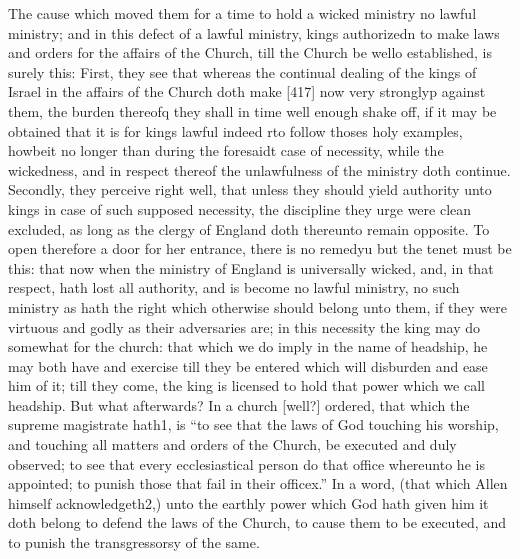 The cause which moved them for a time to hold a wicked ministry no lawful ministry; and in this defect of a lawful ministry, kings authorizedn to make laws and orders for the affairs of the Church, till the Church be wello established, is surely this: First, they see that whereas the continual dealing of the kings of Israel in the affairs of the Church doth make [417] now very stronglyp against them, the burden thereofq they shall in time well enough shake off, if it may be obtained that it is for kings lawful indeed rto follow thoses holy examples, howbeit no longer than during the foresaidt case of necessity, while the wickedness, and in respect thereof the unlawfulness of the ministry doth continue. Secondly, they perceive right well, that unless they should yield authority unto kings in case of such supposed necessity, the discipline they urge were clean excluded, as long as the clergy of England doth thereunto remain opposite. To open therefore a door for her entrance, there is no remedyu but the tenet must be this: that now when the ministry of England is universally wicked, and, in that respect, hath lost all authority, and is become no lawful ministry, no such ministry as hath the right which otherwise should belong unto them, if they were virtuous and godly as their adversaries are; in this necessity the king may do somewhat for the church: that which we do imply in the name of headship, he may both have and exercise till they be entered which will disburden and ease him of it; till they come, the king is licensed to hold that power which we call headship. But what afterwards? In a church [well?] ordered, that which the supreme magistrate hath1, is “to see that the laws of God touching his worship, and touching all matters and orders of the Church, be executed and duly observed; to see that every ecclesiastical person do that office whereunto he is appointed; to punish those that fail in their officex.” In a word, (that which Allen himself acknowledgeth2,) unto the earthly power which God hath given him it doth belong to defend the laws of the Church, to cause them to be executed, and to punish the transgressorsy of the same.

